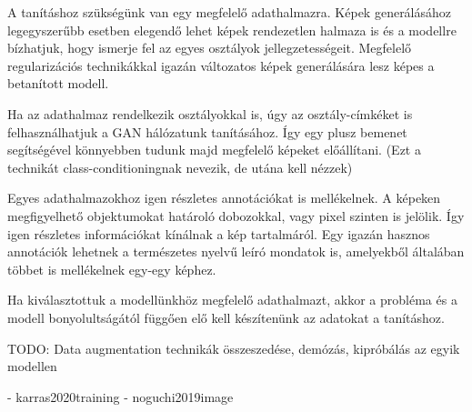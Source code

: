 
A tanításhoz szükségünk van egy megfelelő adathalmazra. Képek generálásához legegyszerűbb esetben elegendő lehet képek rendezetlen halmaza is és a modellre bízhatjuk, hogy ismerje fel az egyes osztályok jellegzetességeit. Megfelelő regularizációs technikákkal igazán változatos képek generálására lesz képes a betanított modell.

Ha az adathalmaz rendelkezik osztályokkal is, úgy az osztály-címkéket is felhasználhatjuk a GAN hálózatunk tanításához. Így egy plusz bemenet segítségével könnyebben tudunk majd megfelelő képeket előállítani. (Ezt a technikát class-conditioningnak nevezik, de utána kell nézzek)

Egyes adathalmazokhoz igen részletes annotációkat is mellékelnek. A képeken megfigyelhető objektumokat határoló dobozokkal, vagy pixel szinten is jelölik. Így igen részletes információkat kínálnak a kép tartalmáról. Egy igazán hasznos annotációk lehetnek a természetes nyelvű leíró mondatok is, amelyekből általában többet is mellékelnek egy-egy képhez.

Ha kiválasztottuk a modellünkhöz megfelelő adathalmazt, akkor a probléma és a modell bonyolultságától függően elő kell készítenünk az adatokat a tanításhoz.

TODO: Data augmentation technikák összeszedése, demózás, kipróbálás az egyik modellen


- karras2020training
- noguchi2019image